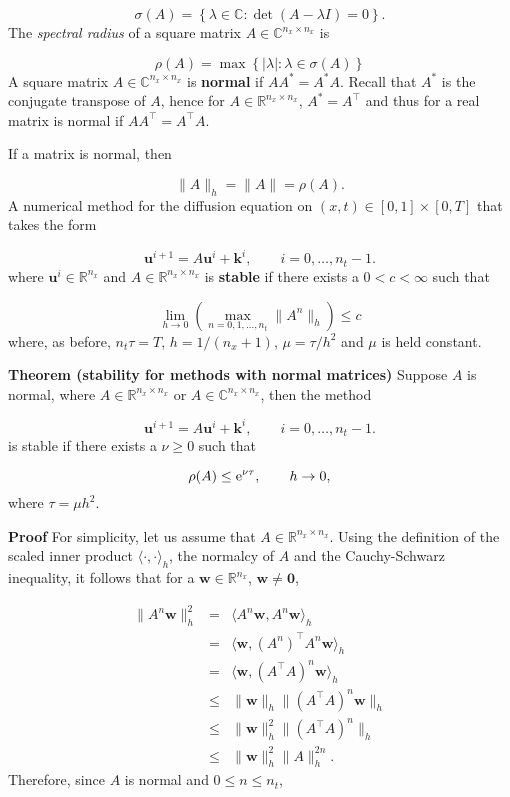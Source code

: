 \documentclass[12pt,landscape]{article}
\begin{document}
{\[
\sigma(A) = \left\lbrace \lambda \in \mathbb{C} : \det(A - \lambda I)= 0  \right\rbrace.
\]
The \emph{spectral radius} of a square matrix $A \in \mathbb{C}^{n_x \times n_x}$ is

\[
\rho(A) = \max\left\lbrace \vert \lambda \vert : \lambda \in \sigma(A)\right\rbrace
\]
A square matrix $A \in \mathbb{C}^{n_x \times n_x}$ is \textbf{normal} if $AA^{*} = A^{*}A$.  Recall that $A^*$ is the conjugate transpose of $A$, hence for  $A \in \mathbb{R}^{n_x \times n_x}$, $A^{*} = A^{\top}$ and thus for a real matrix is normal if $AA^{\top} = A^{\top}A$.

If a matrix is normal, then

\[
\| A \|_h =\| A \| = \rho(A).
\]
A numerical method for the diffusion equation on $(x,t)\in [0, 1]\times[0, T]$ that takes the form

\[
\mathbf{u}^{i+1} = A\mathbf{u}^i + \mathbf{k}^i, \qquad i = 0, \ldots, n_t-1.
\]
where $\mathbf{u}^i \in \mathbb{R}^{n_x}$ and $A \in \mathbb{R}^{n_x \times n_x}$ is \textbf{stable} if there exists a $0 < c < \infty$ such that

\[
\lim_{h \to 0}\left( \max_{n = 0, 1, \ldots, n_t} \| A^n \|_h  \right) \leq c
\]
where, as before, $n_t\tau = T$, $h = 1/(n_x + 1)$, $\mu = \tau/h^2$ and $\mu$ is held constant.

\textbf{Theorem (stability for methods with normal matrices)} Suppose $A$ is normal, where $A \in \mathbb{R}^{n_x \times n_x}$ or $A \in \mathbb{C}^{n_x \times n_x}$,  then the method 

\[
\mathbf{u}^{i+1} = A\mathbf{u}^i + \mathbf{k}^i, \qquad i = 0, \ldots, n_t-1.
\]
is stable if there exists a $\nu \geq 0$ such that

\[
\rho(A) \leq {\rm e}^{\nu \tau}, \qquad h \to 0,
\]
where $\tau = \mu h^2$. 

\textbf{Proof}  For simplicity, let us assume that $A \in \mathbb{R}^{n_x \times n_x}$.  Using the definition of the scaled inner product $\langle \cdot, \cdot \rangle_h$, the normalcy of $A$ and the Cauchy-Schwarz inequality, it follows that for a $\mathbf{w} \in \mathbb{R}^{n_x}$, $\mathbf{w} \neq \mathbf{0}$,


\begin{eqnarray*}
\| A^n \mathbf{w} \|_h^2 &=& \langle A^n\mathbf{w}, A^n\mathbf{w}\rangle_h \\
&=& \langle \mathbf{w},  \left(A^n\right)^{\top}A^n\mathbf{w}\rangle_h \\
&=&  \langle \mathbf{w},  \left(A^{\top}A\right)^n\mathbf{w}\rangle_h \\ 
&\leq & \|  \mathbf{w}\|_h \|\left(A^{\top}A\right)^n\mathbf{w}\|_h \\
&\leq & \|  \mathbf{w}\|_h^2 \|\left(A^{\top}A\right)^n\|_h \\
&\leq & \|  \mathbf{w}\|_h^2 \|A\|_h^{2n}.
\end{eqnarray*}
Therefore, since $A$ is normal and $0 \leq  n \leq n_t$,

}
\end{document}
